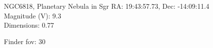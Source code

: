 \begin{block}{NGC6818, Planetary Nebula in Sgr}
    RA: 19:43:57.73, Dec: -14:09:11.4 \\ 
    Magnitude (V): 9.3 \\ 
    Dimensions: 0.77 

    Finder fov: 30 
\end{block}